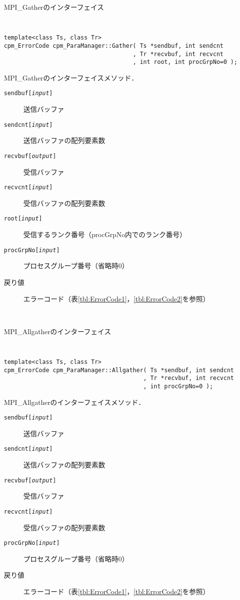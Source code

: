 \begin{spacing}{0.8}
\begin{itembox}[l]{MPI\_Gatherのインターフェイス}
{\tt
\begin{verbatim}
template<class Ts, class Tr>
cpm_ErrorCode cpm_ParaManager::Gather( Ts *sendbuf, int sendcnt
                                     , Tr *recvbuf, int recvcnt
                                     , int root, int procGrpNo=0 );
\end{verbatim}
}
MPI\_Gatherのインターフェイスメソッド．
\begin{description}
\item[{\tt sendbuf[{\it input}]}] 送信バッファ
\item[{\tt sendcnt[{\it input}]}] 送信バッファの配列要素数
\item[{\tt recvbuf[{\it output}]}] 受信バッファ
\item[{\tt recvcnt[{\it input}]}] 受信バッファの配列要素数
\item[{\tt root[{\it input}]}] 受信するランク番号（procGrpNo内でのランク番号）
\item[{\tt procGrpNo[{\it input}]}] プロセスグループ番号（省略時0）
\\
\item[戻り値] エラーコード（表\ref{tbl:ErrorCode1}，\ref{tbl:ErrorCode2}を参照）
\end{description}
\end{itembox}\\
\end{spacing}

\begin{spacing}{0.8}
\begin{itembox}[l]{MPI\_Allgatherのインターフェイス}
{\tt
\begin{verbatim}
template<class Ts, class Tr>
cpm_ErrorCode cpm_ParaManager::Allgather( Ts *sendbuf, int sendcnt
                                        , Tr *recvbuf, int recvcnt
                                        , int procGrpNo=0 );
\end{verbatim}
}
MPI\_Allgatherのインターフェイスメソッド．
\begin{description}
\item[{\tt sendbuf[{\it input}]}] 送信バッファ
\item[{\tt sendcnt[{\it input}]}] 送信バッファの配列要素数
\item[{\tt recvbuf[{\it output}]}] 受信バッファ
\item[{\tt recvcnt[{\it input}]}] 受信バッファの配列要素数
\item[{\tt procGrpNo[{\it input}]}] プロセスグループ番号（省略時0）
\\
\item[戻り値] エラーコード（表\ref{tbl:ErrorCode1}，\ref{tbl:ErrorCode2}を参照）
\end{description}
\end{itembox}\\
\end{spacing}

